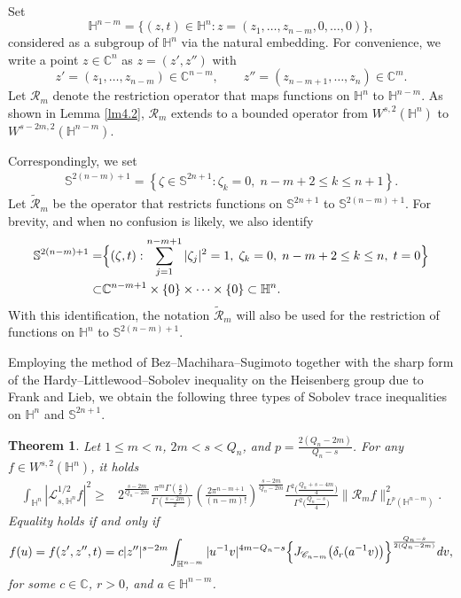 \documentclass[12pt,reqno]{amsart}%
\newtheorem{theorem}{Theorem}[section]
\theoremstyle{plain}
\numberwithin{equation}{section}
\begin{document}
Set
\[
\mathbb{H}^{n-m}=\{(z,t)\in \mathbb{H}^{n} : z=(z_{1},\dots, z_{n-m},0,\dots,0) \},
\]
considered as a subgroup of \(\mathbb{H}^n\) via the natural embedding.
For convenience, we write a point $z\in\mathbb{C}^{n}$ as \( z = (z',z'') \) with
\[
z' = (z_{1},\dots, z_{n-m}) \in \mathbb{C}^{n-m}, \qquad
z'' = (z_{n-m+1},\dots, z_{n}) \in \mathbb{C}^{m}.
\]
Let \(\mathcal{R}_{m}\) denote  the restriction operator that maps  functions on   \( \mathbb{H}^{n} \) to \(\mathbb{H}^{n-m}\).
As shown in Lemma \ref{lm4.2},  \(\mathcal{R}_{m}\) extends to a bounded operator from \(W^{s,2}(\mathbb{H}^{n})\) to \(W^{s-2m,2}(\mathbb{H}^{n-m})\).

Correspondingly, we set
\begin{align}\label{d1.7}
\mathbb{S}^{2(n-m)+1} = \left\{\zeta \in \mathbb{S}^{2n+1} : \zeta_{k}=0, \; n-m+2 \leq k \leq n+1 \right\}.
\end{align}
Let \(\widetilde{\mathcal{R}}_{m}\)  be the operator that restricts  functions on  \( \mathbb{S}^{2n+1} \) to \(\mathbb{S}^{2(n-m)+1}\).
 For brevity, and when no confusion is likely, we also identify
 \begin{align}\label{d1.8}
\mathbb{S}^{2(n-m)+1} =& \Bigl\{(\zeta, t) : \sum_{j=1}^{n-m+1}|\zeta_{j}|^{2}=1,\;  \zeta_{k}=0, \; n-m+2 \leq k \leq n,\; t=0\Bigr\}\\
\subset& \mathbb{C}^{n-m+1}\times \{0\}\times\cdots \times\{0\}\subset  \mathbb{H}^{n}. \nonumber
 \end{align}
With this identification,  the notation \(\widetilde{\mathcal{R}}_{m}\) will also be used for the restriction of  functions on \(  \mathbb{H}^{n} \) to \(\mathbb{S}^{2(n-m)+1}\).


Employing the method of Bez--Machihara--Sugimoto together with the sharp form of the Hardy--Littlewood--Sobolev inequality on the Heisenberg group due to Frank and Lieb, we obtain the following three types of Sobolev trace inequalities on \(\mathbb{H}^{n}\) and $\mathbb{S}^{2n+1}$.

\begin{theorem}\label{th1.3}
Let \( 1 \leq m < n \), \( 2m < s < Q_n \), and \( p = \frac{2(Q_{n} - 2m)}{Q_{n} - s} \). For any \( f \in W^{s,2}(\mathbb{H}^{n}) \), it holds
\begin{align*}
\int_{\mathbb{H}^{n}}|\mathcal{L}_{s,\mathbb{H}^{n}}^{1/2}f|^{2} \geq &
2^{\frac{s-2m}{Q_n-2m}}\frac{\pi^{m}\Gamma\left(\frac{s}{2}\right)}{\Gamma\left(\frac{s-2m}{2}\right)}
\left( \frac{2\pi^{n-m+1}}{(n-m)!} \right)^{\frac{s-2m}{Q_n-2m}}
\frac{\Gamma^{2}\bigl(\frac{Q_n + s - 4m}{4}\bigr)}{\Gamma^{2}\bigl(\frac{Q_n-s}{4}\bigr)}
\|\mathcal{R}_m f\|_{L^{p}(\mathbb{H}^{n-m})}^{2}.
\end{align*}
Equality holds if and only if
\begin{align*}
f(u) = f(z',z'',t) = c|z''|^{s-2m}
\int_{\mathbb{H}^{n-m}} |u^{-1}v|^{4m - Q_n - s}
\Bigl\{J_{\mathscr{C}_{n-m}}\bigl(\delta_r(a^{-1}v)\bigr)\Bigr\}^{\frac{Q_{n} - s}{2(Q_{n} - 2m)}}  dv,
\end{align*}
for some \( c \in \mathbb{C} \), \( r > 0 \), and \( a \in \mathbb{H}^{n-m} \).
\end{theorem}
\end{document}
